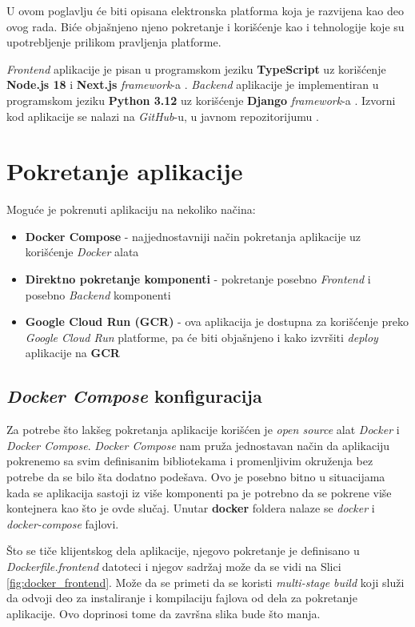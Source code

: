 \documentclass[12pt,oneside]{memoir}
\begin{document}
U ovom poglavlju će biti opisana elektronska platforma koja je razvijena kao deo ovog rada. Biće objašnjeno njeno pokretanje i korišćenje kao i tehnologije koje su upotrebljenje prilikom pravljenja platforme.

\emph{Frontend} aplikacije je pisan u programskom jeziku \textbf{TypeScript} \cite{typescript} uz korišćenje \textbf{Node.js 18} \cite{node} i \textbf{Next.js} \emph{framework}-a \cite{next}.
\emph{Backend} aplikacije je implementiran u programskom jeziku \textbf{Python 3.12} \cite{python} uz korišćenje \textbf{Django} \emph{framework}-a \cite{django}. Izvorni kod aplikacije se nalazi na \emph{GitHub}-u, u javnom repozitorijumu \cite{github}.

\section{Pokretanje aplikacije}

Moguće je pokrenuti aplikaciju na nekoliko načina:
\begin{itemize}
    \item \textbf{Docker Compose} \cite{docker_compose} - najjednostavniji način pokretanja aplikacije uz korišćenje \emph{Docker} alata \cite{docker}
    \item \textbf{Direktno pokretanje komponenti} - pokretanje posebno \emph{Frontend} i posebno \emph{Backend} komponenti
    \item \textbf{Google Cloud Run (GCR)} \cite{gcr} - ova aplikacija je dostupna za korišćenje preko \emph{Google Cloud Run} platforme, pa će biti objašnjeno i kako izvršiti \emph{deploy} aplikacije na \textbf{GCR}
\end{itemize}

\subsection{\emph{Docker Compose} konfiguracija}
Za potrebe što lakšeg pokretanja aplikacije korišćen je \emph{open source} alat \emph{Docker} i \emph{Docker Compose}. \emph{Docker Compose} nam pruža jednostavan način da aplikaciju pokrenemo sa svim definisanim bibliotekama i promenljivim okruženja bez potrebe da se bilo šta dodatno podešava. Ovo je posebno bitno u situacijama kada se aplikacija sastoji iz više komponenti pa je potrebno da se pokrene više kontejnera kao što je ovde slučaj.
Unutar \textbf{docker} foldera nalaze se \emph{docker} i \emph{docker-compose} fajlovi.

Što se tiče klijentskog dela aplikacije, njegovo pokretanje je definisano u \emph{Dockerfile.frontend} datoteci i njegov sadržaj može da se vidi na Slici \ref{fig:docker_frontend}. Može da se primeti da se koristi \emph{multi-stage build} koji služi da odvoji deo za instaliranje i kompilaciju fajlova od dela za pokretanje aplikacije. Ovo doprinosi tome da završna slika bude što manja.
\end{document}
